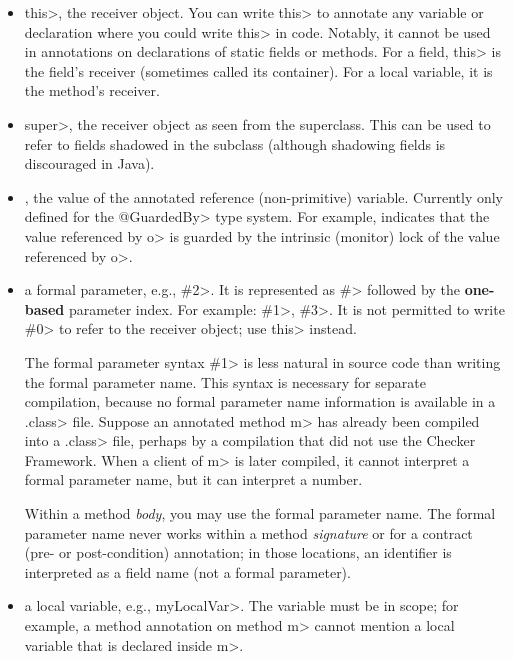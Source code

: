 \begin{itemize}
\item
  \<this>, the receiver object.  You can write \<this> to annotate any
  variable or declaration where you could write \<this> in code.
  Notably, it cannot be used in annotations on declarations of
  static fields or methods.  For a field, \<this> is the field's
  receiver (sometimes called its container).  For a local variable, it is the
  method's receiver.

\item
  \<super>, the receiver object as seen from the superclass.  This can be used
  to refer to fields shadowed in the subclass (although shadowing fields is
  discouraged in Java).

\item
  , the value of the annotated reference (non-primitive) variable.
  Currently only defined for the \<@GuardedBy> type system.
  For example,  indicates that the value
  referenced by \<o> is guarded by the intrinsic (monitor) lock of the value
  referenced by \<o>.

\item
  a formal parameter, e.g., \<\#2>.  It is represented as \<\#> followed by the \textbf{one-based} parameter
  index.  For example: \<\#1>, \<\#3>.  It is not permitted to write \<\#0> to
  refer to the receiver object; use \<this> instead.

  The formal parameter syntax \<\#1> is less natural in source code
  than writing the formal parameter name.  This syntax is necessary for
  separate compilation, because no formal parameter name information is
  available in a \<.class> file.  Suppose an annotated method \<m> has
  already been compiled into a \<.class> file, perhaps by a compilation
  that did not use the Checker Framework.  When a client of \<m> is later
  compiled, it cannot interpret a formal parameter name, but it can
  interpret a number.

  Within a method \emph{body}, you may use the formal parameter name.  The
  formal parameter name never works within a method \emph{signature} or for
  a contract (pre- or post-condition) annotation; in those locations, an
  identifier is interpreted as a field name (not a formal parameter).

\item
  a local variable, e.g., \<myLocalVar>.
  The variable must be in scope; for example, a method annotation on method
  \<m> cannot mention a local variable that is declared inside \<m>.


\end{itemize}
